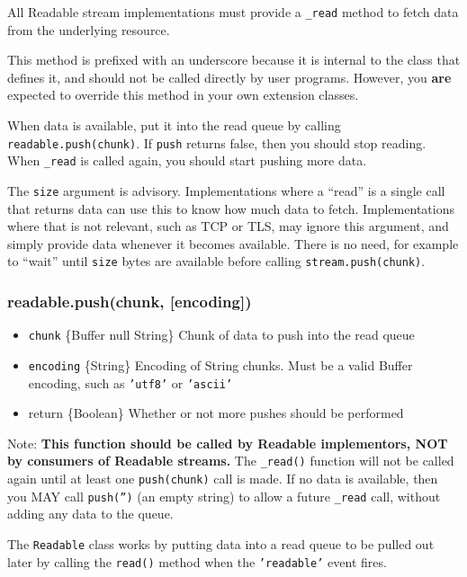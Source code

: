 All Readable stream implementations must provide a \texttt{\_read}
method to fetch data from the underlying resource.

This method is prefixed with an underscore because it is internal to the
class that defines it, and should not be called directly by user
programs. However, you \textbf{are} expected to override this method in
your own extension classes.

When data is available, put it into the read queue by calling
\texttt{readable.push(chunk)}. If \texttt{push} returns false, then you
should stop reading. When \texttt{\_read} is called again, you should
start pushing more data.

The \texttt{size} argument is advisory. Implementations where a ``read''
is a single call that returns data can use this to know how much data to
fetch. Implementations where that is not relevant, such as TCP or TLS,
may ignore this argument, and simply provide data whenever it becomes
available. There is no need, for example to ``wait'' until \texttt{size}
bytes are available before calling \texttt{stream.push(chunk)}.

\subsubsection{readable.push(chunk, {[}encoding{]})}

\begin{itemize}
\item
  \texttt{chunk} \{Buffer \textbar{} null \textbar{} String\} Chunk of
  data to push into the read queue
\item
  \texttt{encoding} \{String\} Encoding of String chunks. Must be a
  valid Buffer encoding, such as \texttt{'utf8'} or \texttt{'ascii'}
\item
  return \{Boolean\} Whether or not more pushes should be performed
\end{itemize}

Note: \textbf{This function should be called by Readable implementors,
NOT by consumers of Readable streams.} The \texttt{\_read()} function
will not be called again until at least one \texttt{push(chunk)} call is
made. If no data is available, then you MAY call \texttt{push('')} (an
empty string) to allow a future \texttt{\_read} call, without adding any
data to the queue.

The \texttt{Readable} class works by putting data into a read queue to
be pulled out later by calling the \texttt{read()} method when the
\texttt{'readable'} event fires.

